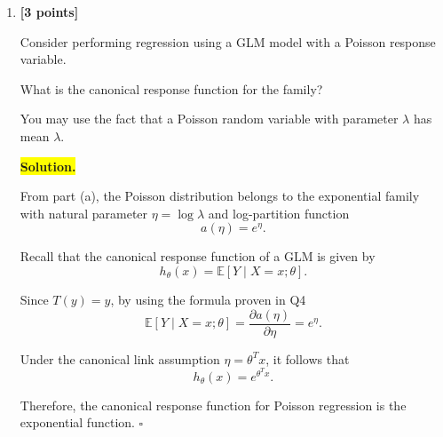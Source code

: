 \documentclass[10pt]{article}
\begin{document}
\begin{enumerate}
\begin{enumerate}[label=(\alph*)]
Define the natural parameter
\[
\eta=\ln\lambda
\quad\Longleftrightarrow\quad
\lambda=e^\eta.
\]

Substituting this into the expression above gives
\[
p(y;\eta)
=
\frac{1}{y!}\exp\left(\eta y-e^\eta\right).
\]

Comparing with the exponential family representation, we identify
\[
\boxed{
\begin{aligned}
b(y)&=\frac{1}{y!},\\[4pt]
\eta&=\ln\lambda,\\[4pt]
T(y)&=y,\\[4pt]
a(\eta)&=e^\eta.
\end{aligned}
}
\]

Therefore, the Poisson distribution belongs to the exponential family.
\hfill $\square$



\item \textbf{[3 points]}

Consider performing regression using a GLM model with a Poisson
response variable.

What is the canonical response function for the family?

You may use the fact that a Poisson random variable with parameter
$\lambda$ has mean $\lambda$.



\medskip
\noindent\colorbox{yellow}{\textbf{Solution.}}
\vspace{3mm}

From part (a), the Poisson distribution belongs to the exponential family
with natural parameter $\eta=\log\lambda$ and log-partition function
\[
a(\eta)=e^\eta.
\]

Recall that the canonical response function of a GLM is given by
\[
h_\theta(x)=\mathbb{E}[Y\mid X=x;\theta].
\]

Since $T(y)=y$, by using the formula proven in Q4
\[
\mathbb{E}[Y\mid X=x;\theta]
=
\frac{\partial a(\eta)}{\partial\eta}
=
e^\eta.
\]

Under the canonical link assumption $\eta=\theta^Tx$, it follows that
\[
\boxed{
h_\theta(x)=e^{\theta^Tx}.
}
\]

Therefore, the canonical response function for Poisson regression
is the exponential function.
\hfill $\square$



\end{enumerate}
\end{enumerate}
\end{document}

